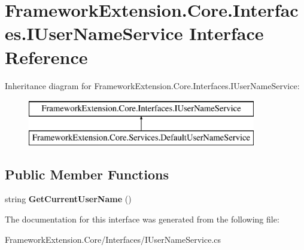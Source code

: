 \hypertarget{interface_framework_extension_1_1_core_1_1_interfaces_1_1_i_user_name_service}{\section{Framework\-Extension.\-Core.\-Interfaces.\-I\-User\-Name\-Service Interface Reference}
\label{interface_framework_extension_1_1_core_1_1_interfaces_1_1_i_user_name_service}
}
Inheritance diagram for Framework\-Extension.\-Core.\-Interfaces.\-I\-User\-Name\-Service\-:\begin{figure}[H]
\begin{center}
\leavevmode
\includegraphics[height=2.000000cm]{interface_framework_extension_1_1_core_1_1_interfaces_1_1_i_user_name_service}
\end{center}
\end{figure}
\subsection*{Public Member Functions}
\begin{DoxyCompactItemize}
\item 
\hypertarget{interface_framework_extension_1_1_core_1_1_interfaces_1_1_i_user_name_service_a6812cf2daf0585c264219dd4354283ce}{string {\bfseries Get\-Current\-User\-Name} ()}\label{interface_framework_extension_1_1_core_1_1_interfaces_1_1_i_user_name_service_a6812cf2daf0585c264219dd4354283ce}

\end{DoxyCompactItemize}


The documentation for this interface was generated from the following file\-:\begin{DoxyCompactItemize}
\item 
Framework\-Extension.\-Core/\-Interfaces/I\-User\-Name\-Service.\-cs\end{DoxyCompactItemize}
